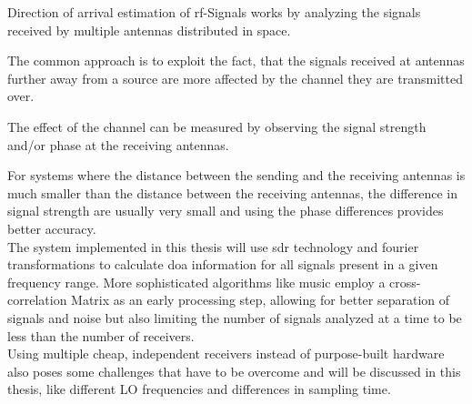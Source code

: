 Direction of arrival estimation of \acrshort{rf}-Signals
works by analyzing the signals received by
multiple antennas distributed in space.

The common approach is to exploit the fact,
that the signals received at antennas further
away from a source are more affected by the channel
they are transmitted over.

The effect of the channel can be measured by
observing the signal strength and/or phase
at the receiving antennas.

For systems where the distance between
the sending and the receiving antennas is much
smaller than the distance between the receiving
antennas, the difference in signal strength
are usually very small and using the phase
differences provides better accuracy. \\

The system implemented in this thesis will use \gls{sdr}
technology and fourier transformations to calculate \gls{doa}
information for all signals present in a given frequency range.
More sophisticated algorithms like \acrshort{music} employ
a cross-correlation Matrix as an early processing step,
allowing for better separation of signals and noise
but also limiting the number of signals analyzed at
a time to be less than the number of receivers. \\

Using multiple cheap, independent receivers instead
of purpose-built hardware also poses some challenges
that have to be overcome and will be discussed in
this thesis, like different LO frequencies and differences
in sampling time.

